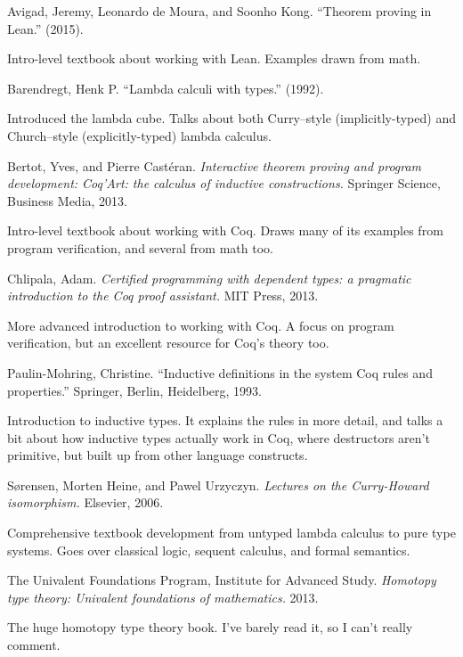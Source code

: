 \documentclass[11pt,paper=letter]{scrartcl}
\begin{document}
\begin{thebibliography}{99}

 Avigad, Jeremy, Leonardo de Moura, and Soonho Kong. ``Theorem proving in Lean.'' (2015).

Intro-level textbook about working with Lean. Examples drawn from math.

 Barendregt, Henk P. ``Lambda calculi with types.'' (1992).

Introduced the lambda cube. Talks about both Curry--style (implicitly-typed) and Church--style (explicitly-typed) lambda calculus.

 Bertot, Yves, and Pierre Castéran. \emph{Interactive theorem proving and program development: Coq'Art: the calculus of inductive constructions.} Springer Science, Business Media, 2013.

Intro-level textbook about working with Coq. Draws many of its examples from program verification, and several from math too.

 Chlipala, Adam. \emph{Certified programming with dependent types: a pragmatic introduction to the Coq proof assistant.} MIT Press, 2013.

More advanced introduction to working with Coq. A focus on program verification, but an excellent resource for Coq's theory too.

 Paulin-Mohring, Christine. ``Inductive definitions in the system Coq rules and properties.'' Springer, Berlin, Heidelberg, 1993.

Introduction to inductive types. It explains the rules in more detail, and talks a bit about how inductive types actually work in Coq, where destructors aren't primitive, but built up from other language constructs.

 Sørensen, Morten Heine, and Pawel Urzyczyn. \emph{Lectures on the Curry-Howard isomorphism.} Elsevier, 2006.

Comprehensive textbook development from untyped lambda calculus to pure type systems. Goes over classical logic, sequent calculus, and formal semantics.

 The Univalent Foundations Program, Institute for Advanced Study. \emph{Homotopy type theory: Univalent foundations of mathematics.} 2013.

The huge homotopy type theory book. I've barely read it, so I can't really comment.

\end{thebibliography}
\end{document}
